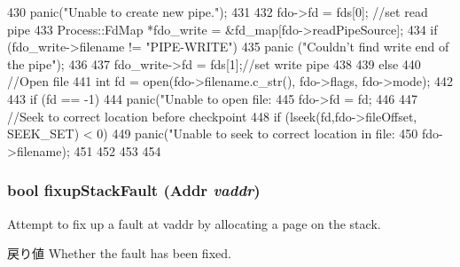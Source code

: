 \begin{DoxyCode}
{{{{{{430                         panic("Unable to create new pipe.");
431                     }
432                     fdo->fd = fds[0]; //set read pipe
433                     Process::FdMap *fdo_write = &fd_map[fdo->readPipeSource];
434                     if (fdo_write->filename != "PIPE-WRITE")
435                         panic ("Couldn't find write end of the pipe");
436 
437                     fdo_write->fd = fds[1];//set write pipe
438                }
439             } else {
440                 //Open file
441                 int fd = open(fdo->filename.c_str(), fdo->flags, fdo->mode);
442 
443                 if (fd == -1)
444                     panic("Unable to open file: %
445                 fdo->fd = fd;
446 
447                 //Seek to correct location before checkpoint
448                 if (lseek(fd,fdo->fileOffset, SEEK_SET) < 0)
449                     panic("Unable to seek to correct location in file: %
450                           fdo->filename);
451             }
452         }
453     }
454 }
\end{DoxyCode}
\hypertarget{classProcess_a5bfc8cca2ce6b8a330e0c209468e5f71}{
\subsubsection[{fixupStackFault}]{\setlength{\rightskip}{0pt plus 5cm}bool fixupStackFault ({\bf Addr} {\em vaddr})}}
\label{classProcess_a5bfc8cca2ce6b8a330e0c209468e5f71}
Attempt to fix up a fault at vaddr by allocating a page on the stack. \begin{DoxyReturn}{戻り値}
Whether the fault has been fixed. 
\end{DoxyReturn}



